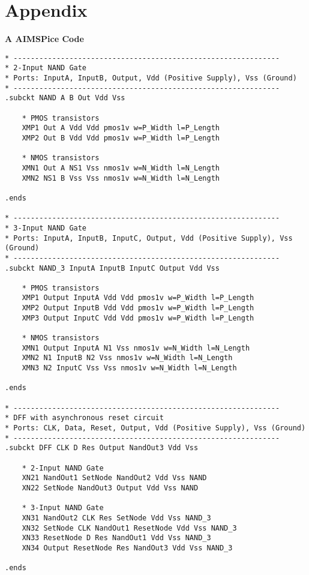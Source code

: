 \section*{Appendix}

\textbf{A AIMSPice Code}

\begin{lstlisting}
* --------------------------------------------------------------
* 2-Input NAND Gate
* Ports: InputA, InputB, Output, Vdd (Positive Supply), Vss (Ground)
* --------------------------------------------------------------
.subckt NAND A B Out Vdd Vss

    * PMOS transistors
    XMP1 Out A Vdd Vdd pmos1v w=P_Width l=P_Length 
    XMP2 Out B Vdd Vdd pmos1v w=P_Width l=P_Length 

    * NMOS transistors
    XMN1 Out A NS1 Vss nmos1v w=N_Width l=N_Length 
    XMN2 NS1 B Vss Vss nmos1v w=N_Width l=N_Length 

.ends

* --------------------------------------------------------------
* 3-Input NAND Gate
* Ports: InputA, InputB, InputC, Output, Vdd (Positive Supply), Vss (Ground)
* --------------------------------------------------------------
.subckt NAND_3 InputA InputB InputC Output Vdd Vss

    * PMOS transistors
    XMP1 Output InputA Vdd Vdd pmos1v w=P_Width l=P_Length 
    XMP2 Output InputB Vdd Vdd pmos1v w=P_Width l=P_Length
    XMP3 Output InputC Vdd Vdd pmos1v w=P_Width l=P_Length

    * NMOS transistors
    XMN1 Output InputA N1 Vss nmos1v w=N_Width l=N_Length 
    XMN2 N1 InputB N2 Vss nmos1v w=N_Width l=N_Length
    XMN3 N2 InputC Vss Vss nmos1v w=N_Width l=N_Length  

.ends

* --------------------------------------------------------------
* DFF with asynchronous reset circuit
* Ports: CLK, Data, Reset, Output, Vdd (Positive Supply), Vss (Ground)
* --------------------------------------------------------------
.subckt DFF CLK D Res Output NandOut3 Vdd Vss

    * 2-Input NAND Gate
    XN21 NandOut1 SetNode NandOut2 Vdd Vss NAND
    XN22 SetNode NandOut3 Output Vdd Vss NAND

    * 3-Input NAND Gate
    XN31 NandOut2 CLK Res SetNode Vdd Vss NAND_3 
    XN32 SetNode CLK NandOut1 ResetNode Vdd Vss NAND_3 
    XN33 ResetNode D Res NandOut1 Vdd Vss NAND_3 
    XN34 Output ResetNode Res NandOut3 Vdd Vss NAND_3 

.ends
\end{lstlisting}

